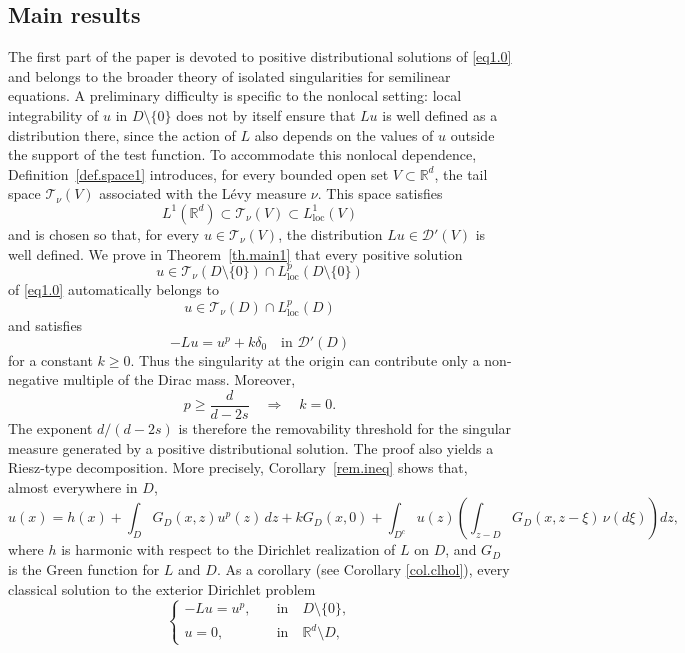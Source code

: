 \documentclass[11pt,a4paper,reqno]{amsart}
\theoremstyle{definition}
\numberwithin{equation}{section}
\begin{document}
\subsection{Main results}

The first part of the paper is devoted to positive distributional solutions of \eqref{eq1.0} and belongs to 
the broader theory of isolated singularities for semilinear equations. A preliminary difficulty is specific to the 
nonlocal setting: local integrability of \(u\) in \(D\setminus\{0\}\) does not by itself ensure that \(Lu\) is well defined as a 
distribution there, since the action of \(L\) also depends on the values of \(u\) outside the support of the test function. 
To accommodate this nonlocal dependence, Definition~\ref{def.space1} introduces, for every bounded open set 
\(V\subset\mathbb R^d\), the tail space \(\mathscr T_\nu(V)\) associated with the L\'evy measure \(\nu\).
This space satisfies
\[
L^1(\mathbb R^d)\subset \mathscr T_\nu(V)
\subset L^1_{\mathrm{loc}}(V)
\]
and is chosen so that, for every $u\in\mathscr T_\nu(V)$, the distribution $Lu\in\mathscr D'(V)$ is well defined.
We prove in Theorem~\ref{th.main1} that every positive solution
\[
u\in \mathscr T_\nu(D\setminus\{0\})\cap L^p_{\mathrm{loc}}(D\setminus\{0\})
\]
of \eqref{eq1.0} automatically belongs to
\[
u\in \mathscr T_\nu(D)\cap L^p_{\mathrm{loc}}(D)
\]
and satisfies
\begin{equation}
\label{eq-firstpl}
-Lu=u^p+k\delta_0\quad\text{in }\mathscr D'(D)
\end{equation}
for a  constant $k\ge0$. Thus the singularity at the origin can contribute only a non-negative multiple of the Dirac mass. Moreover,
\[
p\ge \frac{d}{d-2s}
\quad\Longrightarrow\quad
k=0.
\]
The exponent $d/(d-2s)$ is therefore the removability threshold for the singular measure generated by a positive distributional solution.
The proof also yields a Riesz-type decomposition. More precisely, Corollary~\ref{rem.ineq} shows that, almost everywhere in $D$,
\[
u(x)=h(x)+\int_DG_D(x,z)u^p(z)\,dz+kG_D(x,0)+\int_{D^c}u(z)
\left(
\int_{z-D}G_D(x,z-\xi)\,\nu(d\xi)
\right)dz,
\]
where $h$ is harmonic with respect to the Dirichlet realization of $L$ on $D$, and  $G_D$ is the Green function for $L$ and $D$. 
As a corollary (see Corollary \ref{col.clhol}), every classical   solution to the exterior Dirichlet   problem 
\begin{equation}
\label{eq1.1class}
\begin{cases}
-Lu=u^p,\quad &\text{in}\quad D\setminus\{0\}, \\
u=0,\quad &\text{in}\quad\mathbb{R}^d\setminus D,
\end{cases}
\end{equation}
\end{document}
